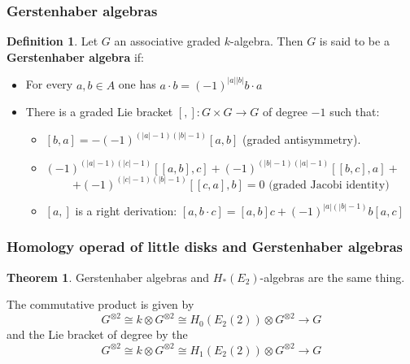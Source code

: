 \documentclass{beamer}
\theoremstyle{definition}
\newtheorem{teorema}{Theorem}
\newtheorem{defi}{Definition}
\begin{document}
\begin{frame}
	\frametitle{Gerstenhaber algebras}
	\begin{defi}
		Let $G$ an associative graded $k$-algebra. Then $G$ is said to be a \textbf{Gerstenhaber algebra} if:
		\begin{itemize}
			\item<2-> For every $a,b\in A$ one has $a\cdot b=(-1)^{|a||b|}b\cdot a$
			\item<3-> There is a graded Lie bracket $[,]:G\times G\to G$ of degree $-1$ such that:
			\begin{itemize}
				\item<4-> $[b,a]=-(-1)^{(|a|-1)(|b|-1)}[a,b]$ (graded antisymmetry).
				\item<5->   $(-1)^{(|a|-1)(|c|-1)}[[a,b],c]+(-1)^{(|b|-1)(|a|-1)}[[b,c],a]+$ $$+(-1)^{(|c|-1)(|b|-1)}[[c,a],b]=0 \text{ (graded Jacobi identity)}$$ 
				\item<6-> $[a,]$ is a right derivation: $[a,b\cdot c] = [a,b]c+(-1)^{|a|(|b|-1)}b[a,c]$ %
			
			\end{itemize}
		\end{itemize}
	\end{defi}
	
\end{frame}



\begin{frame}
	\frametitle{Homology operad of little disks and Gerstenhaber algebras}
	
	\begin{teorema}
		Gerstenhaber algebras and $H_*(E_2)$-algebras are the same thing.
	\end{teorema}\pause 
	The commutative product is given by 
	\[
	G^{\otimes 2}\cong k\otimes G^{\otimes 2}\cong H_0(E_2(2))\otimes G^{\otimes 2}\to G
	\]
	\pause
	and the Lie bracket of degree by the
	\[
	G^{\otimes 2}\cong k\otimes G^{\otimes 2}\cong H_1(E_2(2))\otimes G^{\otimes 2}\to G
	\]
\end{frame}


%
\end{document}
